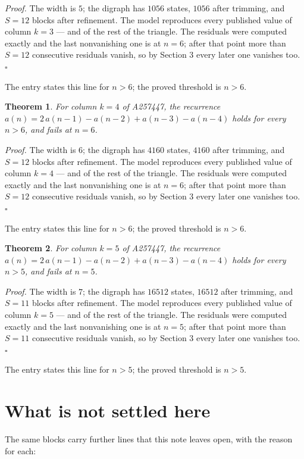 \documentclass[11pt]{article}
\newtheorem{theorem}{Theorem}
\theoremstyle{definition}
\begin{document}
{\itshape Proof.} The width is $5$; the digraph has $1056$ states, $1056$ after trimming, and $S = 12$ blocks after refinement. The model reproduces every published value of column $k = 3$ --- and of the rest of the triangle. The residuals were computed exactly and the last nonvanishing one is at $n = 6$; after that point more than $S = 12$ consecutive residuals vanish, so by Section 3 every later one vanishes too. $\square$

The entry states this line for $n > 6$; the proved threshold is $n > 6$.

\begin{theorem} For column $k = 4$ of A257447, the recurrence $a(n) = 2\,a(n-1) - a(n-2) + a(n-3) - a(n-4)$ holds for every $n > 6$, and fails at $n = 6$.\end{theorem}

{\itshape Proof.} The width is $6$; the digraph has $4160$ states, $4160$ after trimming, and $S = 12$ blocks after refinement. The model reproduces every published value of column $k = 4$ --- and of the rest of the triangle. The residuals were computed exactly and the last nonvanishing one is at $n = 6$; after that point more than $S = 12$ consecutive residuals vanish, so by Section 3 every later one vanishes too. $\square$

The entry states this line for $n > 6$; the proved threshold is $n > 6$.

\begin{theorem} For column $k = 5$ of A257447, the recurrence $a(n) = 2\,a(n-1) - a(n-2) + a(n-3) - a(n-4)$ holds for every $n > 5$, and fails at $n = 5$.\end{theorem}

{\itshape Proof.} The width is $7$; the digraph has $16512$ states, $16512$ after trimming, and $S = 11$ blocks after refinement. The model reproduces every published value of column $k = 5$ --- and of the rest of the triangle. The residuals were computed exactly and the last nonvanishing one is at $n = 5$; after that point more than $S = 11$ consecutive residuals vanish, so by Section 3 every later one vanishes too. $\square$

The entry states this line for $n > 5$; the proved threshold is $n > 5$.

\section{What is not settled here}

The same blocks carry further lines that this note leaves open, with the reason for each:
\end{document}
